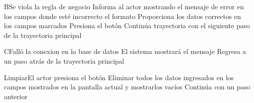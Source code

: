 
\begin{UCtrayectoriaA}{B}{Se viola la regla de negocio }	
			\UCpaso[\UCsist] Informa al actor mostrando el mensaje de error  en los campos donde esté incorrecto el formato
			\UCpaso[\UCactor] Proporciona los datos correctos en los campos marcados 
			\UCpaso[\UCactor] Presiona el botón     
			\UCpaso[\UCsist] Continúa trayectoria con el siguiente paso de la trayectoria principal 
\end{UCtrayectoriaA}


\begin{UCtrayectoriaA}{C}{Falló la conexion en la base de datos}
			\UCpaso[\UCsist] El sistema mostrará el mensaje 
			\UCpaso[\UCsist] Regresa a un paso atrás de la trayectoria principal 
\end{UCtrayectoriaA}


\begin{UCtrayectoriaA}{Limpiar}{El actor presiona el botón }
			\UCpaso[\UCsist] Eliminar todos los datos ingresados en los campos mostrados en la pantalla actual y mostrarlos vacíos
			\UCpaso[\UCsist] Continúa con un paso anterior
\end{UCtrayectoriaA}